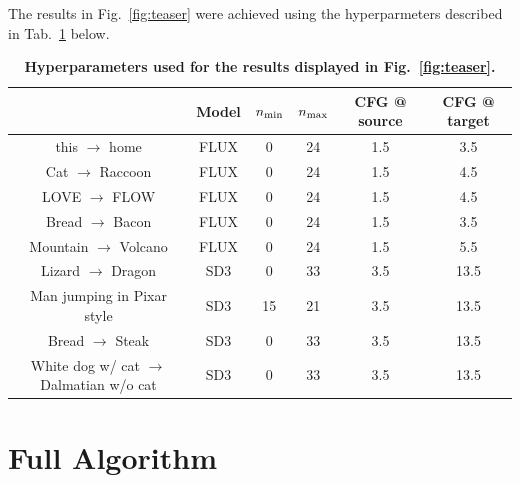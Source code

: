 The results in Fig.~\ref{fig:teaser} were achieved using the hyperparmeters described in Tab.~\ref{tab:metrics-fig1} below.

\begin{table}[h]
\centering
\caption{\textbf{Hyperparameters used for the results displayed in Fig.~\ref{fig:teaser}.}}
\label{tab:metrics-fig1}
\begin{tabular}{@{}cccccc@{}}
\toprule
& Model & $n_{\text{\text{min}}}$ & $n_{\text{\text{max}}}$ & CFG @ source & CFG @ target \\ \midrule
this $\rightarrow$ home & FLUX  & 0 & 24 & 1.5 & 3.5  \\
Cat $\rightarrow$ Raccoon & FLUX  & 0  & 24 & 1.5 & 4.5  \\
LOVE $\rightarrow$ FLOW & FLUX  & 0  & 24 & 1.5 & 4.5  \\
Bread $\rightarrow$ Bacon & FLUX  & 0 & 24 & 1.5 & 3.5  \\
Mountain $\rightarrow$ Volcano & FLUX  & 0 & 24 & 1.5 & 5.5  \\
Lizard $\rightarrow$ Dragon & SD3  & 0  & 33 & 3.5 & 13.5  \\
Man jumping in Pixar style & SD3  & 15 & 21  & 3.5 & 13.5  \\
Bread $\rightarrow$ Steak & SD3  & 0  & 33 & 3.5 & 13.5  \\
White dog w/ cat $\rightarrow$ Dalmatian w/o cat & SD3  & 0  & 33  & 3.5 & 13.5  \\
\bottomrule
\end{tabular}
\end{table}

\clearpage
\section{Full Algorithm}

